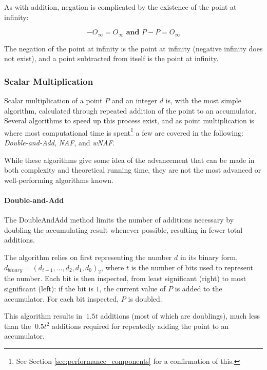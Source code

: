 As with addition, negation is complicated by the existence of the point at infinity:

\begin{equation}
	-O_\infty = O_\infty \textbf{ and } P - P = O_\infty
\end{equation}

The negation of the point at infinity is the point at infinity (negative infinity does not exist), and a point subtracted from
itself is the point at infinity.\cite{hankerson2010}

\subsubsection{Scalar Multiplication}
\label{sec:math_curve_multiplication}

Scalar multiplication of a point \(P\) and an integer \(d\) is, with the most simple algorithm, calculated through repeated addition
of the point to an accumulator. Several algorithms to speed up this process exist, and as point multiplication is where most computational
time is spent\footnote{See Section \ref{sec:performance_components} for a confirmation of this.} a few are covered in the following:
\emph{Double-and-Add}, \emph{NAF}, and \emph{wNAF}.

While these algorithms give some idea of the advancement that can be made in both complexity and theoretical running time, they are not
the most advanced or well-performing algorithms known.\cite{hankerson2010}

\paragraph{Double-and-Add}

The DoubleAndAdd method limits the number of additions necessary by doubling the accumulating result whenever possible, resulting in
fewer total additions.

The algorithm relies on first representing the number \(d\) in its binary form, \(d_{binary} = (d_{t-1}, ... , d_2, d_1, d_0)_2\),
where \(t\) is the number of bits used to represent the number. Each bit is then inspected, from least significant (right) to most
significant (left): if the bit is \(1\), the current value of \(P\) is added to the accumulator. For each bit inspected, \(P\) is
doubled.\cite{hankerson2010}

This algorithm results in \(~1.5t\) additions (most of which are doublings), much less than the \(~0.5t^2\) additions required for
repeatedly adding the point to an accumulator.

